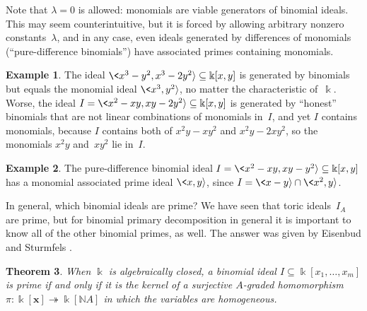 \documentclass[12pt]{amsart}
\numberwithin{equation}{section}
\newtheorem{thm}{Theorem}[section]
\theoremstyle{definition}
\newtheorem{example}[thm]{Example}
\begin{document}
Note that $\lambda = 0$ is allowed: monomials are viable generators of
binomial ideals.  This may seem counterintuitive, but it is forced by
allowing arbitrary nonzero constants~$\lambda$, and in any case, even
ideals generated by differences of monomials (``pure-difference
binomials'') have associated primes containing monomials.

\begin{example}
The ideal $\<x^3-y^2, x^3-2y^2{\rangle} \subseteq {\Bbbk}[x,y]$ is generated by
binomials but equals the monomial ideal $\<x^3,y^2{\rangle}$, no matter the
characteristic of~${\Bbbk}$.  Worse, the ideal $I = \<x^2 - xy, xy -
2y^2{\rangle} \subseteq {\Bbbk}[x,y]$ is generated by ``honest'' binomials that
are not linear combinations of monomials in~$I$, and yet $I$ contains
monomials, because $I$ contains both of $x^2y - xy^2$ and $x^2y -
2xy^2$, so the monomials $x^2y$ and~$xy^2$ lie in~$I$.
\end{example}

\begin{example}
The pure-difference binomial ideal $I = \<x^2-xy, xy-y^2{\rangle} \subseteq
{\Bbbk}[x,y]$ has a monomial associated prime ideal $\<x,y{\rangle}$, since $I =
\<x-y{\rangle} \cap \<x^2,y{\rangle}$.
\end{example}

In general, which binomial ideals are prime?  We have seen that toric
ideals~$I_A$ are prime, but for binomial primary decomposition in
general it is important to know all of the other binomial primes, as
well.  The answer was given by Eisenbud and Sturmfels
\cite[Corollary~2.6]{binomialIdeals}.

\begin{thm}\label{t:prime}
When ${\Bbbk}$ is algebraically closed, a binomial ideal $I \subseteq
{\Bbbk}[x_1,\ldots,x_m]$ is prime if and only if it is the kernel of a
surjective $A$-graded homomorphism $\pi: {\Bbbk}[{\mathbf{x}}] {\twoheadrightarrow} {\Bbbk}[{\mathbb{N}} A]$ in
which the variables are homogeneous.
\end{thm}
\end{document}
